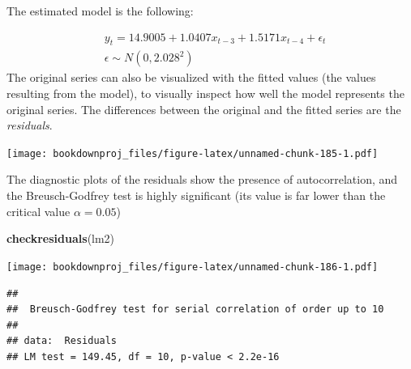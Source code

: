 \documentclass[
]{article}
\newenvironment{Shaded}{\begin{snugshade}}{\end{snugshade}}
\newcommand{\DataTypeTok}[1]{\textcolor[rgb]{0.13,0.29,0.53}{#1}}
\newcommand{\DecValTok}[1]{\textcolor[rgb]{0.00,0.00,0.81}{#1}}
\newcommand{\KeywordTok}[1]{\textcolor[rgb]{0.13,0.29,0.53}{\textbf{#1}}}
\newcommand{\NormalTok}[1]{#1}
\newcommand{\OperatorTok}[1]{\textcolor[rgb]{0.81,0.36,0.00}{\textbf{#1}}}
\newcommand{\StringTok}[1]{\textcolor[rgb]{0.31,0.60,0.02}{#1}}
\begin{document}
The estimated model is the following:

\[
\begin{aligned} 
& y_t = 14.9005 + 1.0407x_{t-3} + 1.5171x_{t-4} + \epsilon_t \\
& \epsilon \sim N(0, 2.028^2)
\end{aligned}
\]
The original series can also be visualized with the fitted values (the values resulting from the model), to visually inspect how well the model represents the original series. The differences between the original and the fitted series are the \emph{residuals}.

\begin{Shaded}
\end{Shaded}

\texttt{[image: bookdownproj\_files/figure-latex/unnamed-chunk-185-1.pdf]}

The diagnostic plots of the residuals show the presence of autocorrelation, and the Breusch-Godfrey test is highly significant (its value is far lower than the critical value \(\alpha = 0.05\))

\begin{Shaded}
\begin{Highlighting}[]
\KeywordTok{checkresiduals}\NormalTok{(lm2)}
\end{Highlighting}
\end{Shaded}

\texttt{[image: bookdownproj\_files/figure-latex/unnamed-chunk-186-1.pdf]}

\begin{verbatim}
## 
##  Breusch-Godfrey test for serial correlation of order up to 10
## 
## data:  Residuals
## LM test = 149.45, df = 10, p-value < 2.2e-16
\end{verbatim}
\end{document}
